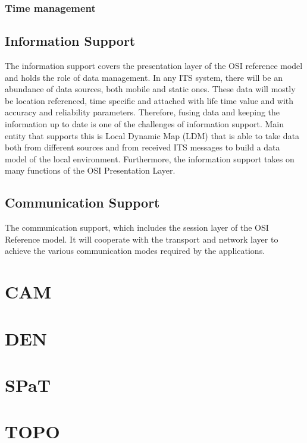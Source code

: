 \subsubsection{Time management}

\subsection{Information Support}
The information support covers the presentation layer of the OSI reference model and holds the role of
data management. In any ITS system, there will be an abundance of data sources, both mobile and static
ones. These data will mostly be location referenced, time specific and attached with life time value and
with accuracy and reliability parameters. Therefore, fusing data and keeping the information up to date is
one of the challenges of information support. Main entity that supports this is Local Dynamic
Map (LDM) that is able to take data both from different sources and from received ITS messages to build
a data model of the local environment. Furthermore, the information support takes on many functions of
the OSI Presentation Layer. 

\subsection{Communication Support}
The communication support, which includes the session layer of the OSI Reference model. It will
cooperate with the transport and network layer to achieve the various communication modes required by
the applications. 

\section{CAM\label{sec:cam}}

\section{DEN\label{sec:den}}


\section{SPaT\label{sec:spat}}

\section{TOPO\label{sec:topo}}
